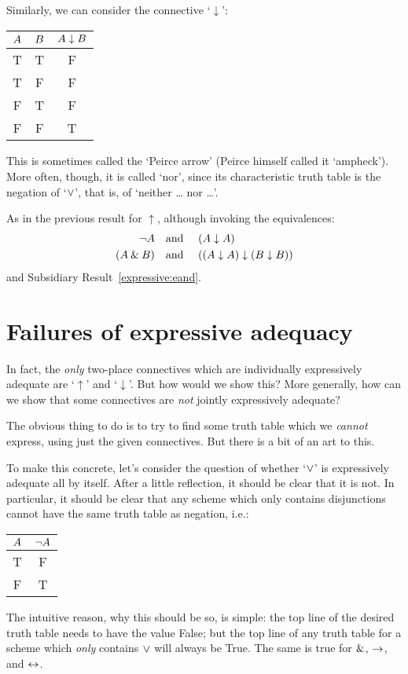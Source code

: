 Similarly, we can consider the connective `$\downarrow$':
\begin{center}
\begin{tabular}{c c | c}
$A$ & $B$ & $A \mathrel{\downarrow} B$\\
\hline
 T & T & F \\
 T & F & F  \\
 F & T & F  \\
 F & F & T
\end{tabular}
\end{center}
This is sometimes called the `Peirce arrow' (Peirce himself called it `ampheck'). More often, though, it is called `nor', since its characteristic truth table is the negation of `$\vee$', that is, of `neither \dots{} nor \dots'.

As in the previous result for $\uparrow$, although invoking the equivalences:
		\begin{align*}
			\neg A &\text{\quad and \quad} (A \downarrow A)\\
			(A \mathbin{\&} B) & \text{\quad and \quad} ((A \downarrow A) \downarrow (B \downarrow B))
		\end{align*}
and Subsidiary Result~\ref{expressive:eand}.


\section{Failures of expressive adequacy}

In fact, the \emph{only} two-place connectives which are individually expressively adequate are `$\uparrow$' and `$\downarrow$'. But how would we show this? More generally, how can we show that some connectives are \emph{not} jointly expressively adequate?

The obvious thing to do is to try to find some truth table which we \emph{cannot} express, using just the given connectives. But there is a bit of an art to this.

To make this concrete, let's consider the question of whether `$\vee$' is expressively adequate all by itself. After a little reflection, it should be clear that it is not. In particular, it should be clear that any scheme which only contains disjunctions cannot have the same truth table as negation, i.e.:
				\begin{center}
				\begin{tabular}{c | c}
				$A$ & $\neg A$\\
				\hline
				 T & F \\
				 F & T
				\end{tabular}
				\end{center}
The intuitive reason, why this should be so, is simple: the top line of the desired truth table needs to have the value False; but the top line of any truth table for a scheme which \emph{only} contains $\vee$ will always be True. The same is true for $\mathbin{\&}$, $\rightarrow$, and $\leftrightarrow$.

